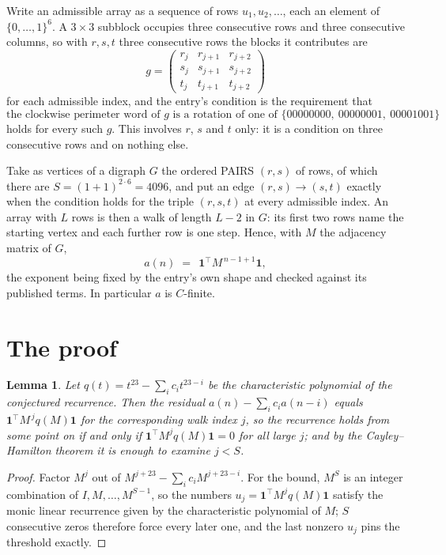 \documentclass[11pt,a4paper]{article}
\theoremstyle{plain}
\newtheorem{lemma}[theorem]{Lemma}
\theoremstyle{definition}
\begin{document}
Write an admissible array as a sequence of rows $u_1,u_2,\dots$, each an element of
$\{0,\dots,1\}^{6}$. A $3\times3$ subblock occupies three consecutive rows and
three consecutive columns, so with $r,s,t$ three consecutive rows the blocks it
contributes are
\[
g=\begin{pmatrix}r_j&r_{j+1}&r_{j+2}\\ s_j&s_{j+1}&s_{j+2}\\ t_j&t_{j+1}&t_{j+2}\end{pmatrix}
\]
for each admissible index, and the entry's condition is the requirement that
\[
\text{the clockwise perimeter word of }g\text{ is a rotation of one of }\{00000000,\ 00000001,\ 00001001\}
\]
holds for every such $g$. This involves $r$, $s$ and $t$ only: it is a condition on
three consecutive rows and on nothing else.

Take as vertices of a digraph $G$ the ordered PAIRS $(r,s)$ of rows, of which there are
$S=(1+1)^{2\cdot6}=4096$, and put an edge $(r,s)\to(s,t)$ exactly when the condition
holds for the triple $(r,s,t)$ at every admissible index. An array with $L$ rows is then a
walk of length $L-2$ in $G$: its first two rows name the starting vertex and each further
row is one step. Hence, with $M$ the adjacency matrix of $G$,
\[
a(n)\;=\;\,\mathbf{1}^{\!\top}M^{\,n-1+1}\mathbf{1},
\]
the exponent being fixed by the entry's own shape and checked against its published terms.
In particular $a$ is $C$-finite.

\section{The proof}

\begin{lemma}\label{lem:crit}
Let $q(t)=t^{23}-\sum_i c_it^{23-i}$ be the characteristic polynomial of the
conjectured recurrence. Then the residual $a(n)-\sum_ic_ia(n-i)$ equals
$\mathbf{1}^{\!\top}M^{\,j}q(M)\mathbf{1}$ for the corresponding walk index
$j$, so the recurrence holds from some point on if and only if
$\mathbf{1}^{\!\top}M^{j}q(M)\mathbf{1}=0$ for all large $j$; and by the
Cayley--Hamilton theorem it is enough to examine $j<S$.
\end{lemma}

\begin{proof}
Factor $M^{j}$ out of $M^{j+23}-\sum_ic_iM^{j+23-i}$. For the bound, $M^{S}$
is an integer combination of $I,M,\dots,M^{S-1}$, so the numbers
$u_j=\mathbf{1}^{\!\top}M^{j}q(M)\mathbf{1}$ satisfy the monic linear recurrence given by
the characteristic polynomial of $M$; $S$ consecutive zeros therefore force every later one,
and the last nonzero $u_j$ pins the threshold exactly.
\end{proof}
\end{document}
